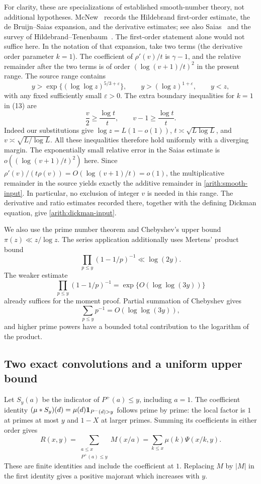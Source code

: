 For clarity, these are specializations of established smooth-number theory,
not additional hypotheses. McNew~\cite[(7), (13), (14), (17)]{mcnew}
records the Hildebrand first-order estimate, the de Bruijn--Saias expansion,
and the derivative estimates; see also Saias~\cite{saias} and the survey
of Hildebrand--Tenenbaum~\cite{hildebrandtenenbaum}.
The first-order statement alone would not suffice here.
In the notation of that expansion, take two terms (the derivative order
parameter $k=1$). The coefficient of $\rho'(v)/t$ is $\gamma-1$,
and the relative remainder after the two terms is of order
$(\log(v+1)/t)^2$ in the present range.
The source range contains
\[
 y>\exp\{(\log\log z)^{5/3+\varepsilon}\},\qquad
 y>(\log z)^{1+\varepsilon},\qquad y<z,
\]
with any fixed sufficiently small $\varepsilon>0$.
The extra boundary inequalities for $k=1$ in (13) are
\[
 \frac v2\ge\frac{\log t}{t},\qquad
 v-1\ge\frac{\log t}{t}.
\]
Indeed our substitutions give $\log z=L(1-o(1))$,
$t\asymp\sqrt{L\log L}$, and
$v\asymp\sqrt{L/\log L}$. All these inequalities therefore hold uniformly
with a diverging margin. The exponentially small relative error in the
Saias estimate is $o((\log(v+1)/t)^2)$ here. Since
$\rho'(v)/(t\rho(v))=O(\log(v+1)/t)=o(1)$, the multiplicative
remainder in the source yields exactly the additive remainder in
\eqref{arith:smooth-input}. In particular, no exclusion of integer $v$ is
needed in this range. The derivative and ratio estimates recorded there,
together with the defining Dickman equation, give
\eqref{arith:dickman-input}.

We also use the prime number theorem and Chebyshev's upper bound
$\pi(z)\ll z/\log z$. The series application additionally uses
Mertens' product bound
\[
 \prod_{p\le y}(1-1/p)^{-1}\ll\log(2y).
\]
The weaker estimate
\begin{equation}\label{arith:harmonic-product}
 \prod_{p\le y}(1-1/p)^{-1}
 =\exp\{O(\log\log(3y))\}
\end{equation}
already suffices for the moment proof. Partial summation of Chebyshev gives
\[
 \sum_{p\le y}p^{-1}=O(\log\log(3y)),
\]
and higher prime powers have a bounded total contribution to the logarithm
of the product.

\subsection{Two exact convolutions and a uniform upper bound}

Let $S_y(a)$ be the indicator of $P^+(a)\le y$, including $a=1$.
The coefficient identity
$(\mu*S_y)(d)=\mu(d)\mathbf{1}_{P^-(d)>y}$ follows prime by prime:
the local factor is $1$ at primes at most $y$ and $1-X$ at larger primes.
Summing its coefficients in either order gives
\begin{equation}\label{arith:convolutions}
 R(x,y)=\sum_{\substack{a\le x\\P^+(a)\le y}}M(x/a)
       =\sum_{k\le x}\mu(k)\Psi(x/k,y).
\end{equation}
These are finite identities and include the coefficient at $1$.
Replacing $M$ by $|M|$ in the first identity gives a positive majorant
which increases with $y$.

